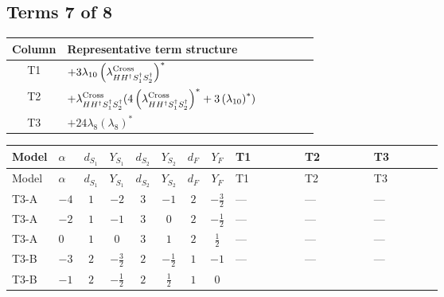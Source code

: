 \documentclass[8pt]{article}
\begin{document}
\begin{landscape}
\subsection*{Terms 7 of 8}
\begin{center}
\begin{tabular}{@{}c >{\raggedright\arraybackslash}p{0.82\linewidth}@{}}
\toprule
Column & Representative term structure \\
\midrule
T1 & \(\displaystyle +3 {\lambda_{10}} \left({\lambda_{H H^\dagger S_1^\dagger S_2^\dagger}^{\rm Cross}}\right)^{*}\) \\
\midrule
T2 & \(\displaystyle +{\lambda_{H H^\dagger S_1^\dagger S_2^\dagger}^{\rm Cross}} (4 \left({\lambda_{H H^\dagger S_1^\dagger S_2^\dagger}^{\rm Cross}}\right)^{*}+3 \left({\lambda_{10}}\right)^{*})\) \\
\midrule
T3 & \(\displaystyle +24 {\lambda_{8}} \left({\lambda_{8}}\right)^{*}\) \\
\midrule
\bottomrule
\end{tabular}
\end{center}
\smallskip
\tiny
\begin{longtable}{@{}llcccccc >{\raggedright\arraybackslash}p{0.21\linewidth} >{\raggedright\arraybackslash}p{0.21\linewidth} >{\raggedright\arraybackslash}p{0.21\linewidth}@{}}
\toprule
Model & $\alpha$ & $d_{S_1}$ & $Y_{S_1}$ & $d_{S_2}$ & $Y_{S_2}$ & $d_F$ & $Y_F$ & T1 & T2 & T3 \\
\midrule
\endfirsthead
\toprule
Model & $\alpha$ & $d_{S_1}$ & $Y_{S_1}$ & $d_{S_2}$ & $Y_{S_2}$ & $d_F$ & $Y_F$ & T1 & T2 & T3 \\
\midrule
\endhead
T3-A & $-4$ & $1$ & $-2$ & $3$ & $-1$ & $2$ & $-\frac{3}{2}$ & --- & --- & --- \\
\midrule
T3-A & $-2$ & $1$ & $-1$ & $3$ & $0$ & $2$ & $-\frac{1}{2}$ & --- & --- & --- \\
\midrule
T3-A & $0$ & $1$ & $0$ & $3$ & $1$ & $2$ & $\frac{1}{2}$ & --- & --- & --- \\
\midrule
T3-B & $-3$ & $2$ & $-\frac{3}{2}$ & $2$ & $-\frac{1}{2}$ & $1$ & $-1$ & --- & --- & --- \\
\midrule
T3-B & $-1$ & $2$ & $-\frac{1}{2}$ & $2$ & $\frac{1}{2}$ & $1$ & $0$ & \scriptsize\adjustbox{max width=\linewidth}{$\begin{gathered} +3 {\lambda_{10}} \left({\lambda_{H H^\dagger S_1^\dagger S_2^\dagger}^{\rm Cross}}\right)^{*}\end{gathered}$} & \scriptsize\adjustbox{max width=\linewidth}{$\begin{gathered} +{\lambda_{H H^\dagger S_1^\dagger S_2^\dagger}^{\rm Cross}} (4 \left({\lambda_{H H^\dagger S_1^\dagger S_2^\dagger}^{\rm Cross}}\right)^{*}+3 \left({\lambda_{10}}\right)^{*})\end{gathered}$} & \scriptsize\adjustbox{max width=\linewidth}{$\begin{gathered} +24 {\lambda_{8}} \left({\lambda_{8}}\right)^{*}\end{gathered}$} \\

\end{longtable}
\end{landscape}
\end{document}
